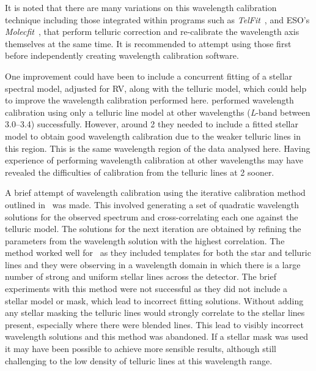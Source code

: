 It is noted that there are many variations on this wavelength calibration technique including those integrated within programs such as \emph{TelFit}~\citet{gullikson_correcting_2014}, and {ESO}'s \emph{Molecfit}~\citet{smette_molecfit_2015}, that perform telluric correction and re-calibrate the wavelength axis themselves at the same time.
It is recommended to attempt using those first before independently creating wavelength calibration software.

One improvement could have been to include a concurrent fitting of a stellar spectral model, adjusted for {RV}, along with the telluric model, which could help to improve the wavelength calibration performed here.
\citet{piskorz_evidence_2016} performed wavelength calibration using only a telluric line model at other \nir{} wavelengths (\emph{L}-band between 3.0--3.4\um{}) successfully.
However, around 2\um{} they needed to include a fitted stellar model to obtain good wavelength calibration due to the weaker telluric lines in this region.
This is the same wavelength region of the data analysed here.
Having experience of performing wavelength calibration at other wavelengths may have revealed the difficulties of calibration from the telluric lines at 2\um{} sooner.

A brief attempt of wavelength calibration using the iterative calibration method outlined in~\cite{brogi_rotation_2016} was made.
This involved generating a set of quadratic wavelength solutions for the observed spectrum and cross-correlating each one against the telluric model.
The solutions for the next iteration are obtained by refining the parameters from the wavelength solution with the highest correlation.
The method worked well for~\citet{brogi_rotation_2016} as they included templates for both the star and telluric lines and they were observing in a wavelength domain in which there is a large number of strong and uniform stellar  lines across the detector.
The brief experiments with this method were not successful as they did not include a stellar model or mask, which lead to incorrect fitting solutions.
Without adding any stellar masking the telluric lines would strongly correlate to the stellar lines present, especially where there were blended lines.
This lead to visibly incorrect wavelength solutions and this method was abandoned.
If a stellar mask was used it may have been possible to achieve more sensible results, although still challenging to the low density of telluric lines at this wavelength range.

